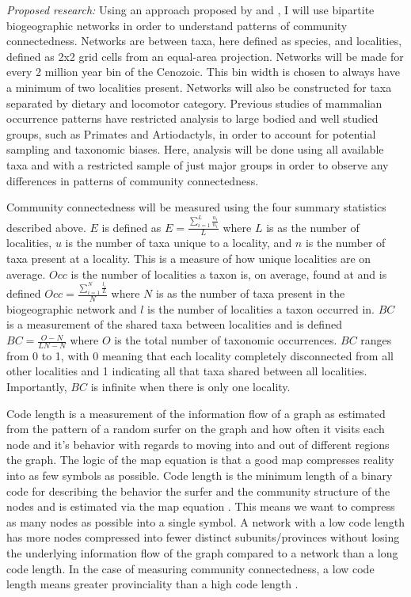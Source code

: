 \documentclass[12pt,letterpaper]{article}
\begin{document}
\textit{Proposed research:}
Using an approach proposed by \citet{Sidor2013} and \citet{Vilhena2013}, I will use bipartite biogeographic networks in order to understand patterns of community connectedness. Networks are between taxa, here defined as species, and localities, defined as 2x2 grid cells from an equal-area projection. Networks will be made for every 2 million year bin of the Cenozoic. This bin width is chosen to always have a minimum of two localities present. Networks will also be constructed for taxa separated by dietary and locomotor category. Previous studies of mammalian occurrence patterns have restricted analysis to large bodied and well studied groups, such as Primates and Artiodactyls, in order to account for potential sampling and taxonomic biases. Here, analysis will be done using all available taxa and with a restricted sample of just major groups in order to observe any differences in patterns of community connectedness. 

Community connectedness will be measured using the four summary statistics described above. \(E\) is defined as 
\(
  E = \frac{\sum_{i = 1}^{L} \frac{u_{i}}{n_{i}}}{L}
\)
where \(L\) is as the number of localities, \(u\) is the number of taxa unique to a locality, and \(n\) is the number of taxa present at a locality. This is a measure of how unique localities are on average. \(Occ\) is the number of localities a taxon is, on average, found at and is defined
\(
  Occ = \frac{\sum_{i = 1}^{N} \frac{l_{i}}{L}}{N}
\)
where \(N\) is as the number of taxa present in the biogeographic network and \(l\) is the number of localities a taxon occurred in. \(BC\) is a measurement of the shared taxa between localities and is defined 
\(
  BC = \frac{O - N}{LN - N}
\)
where \(O\) is the total number of taxonomic occurrences. \(BC\) ranges from 0 to 1, with 0 meaning that each locality completely disconnected from all other localities and 1 indicating all that taxa shared between all localities. Importantly, \(BC\) is infinite when there is only one locality.

Code length is a measurement of the information flow of a graph as estimated from the pattern of a random surfer \citep{Brin1998} on the graph and how often it visits each node and it's behavior with regards to moving into and out of different regions the graph. The logic of the map equation is that a good map compresses reality into as few symbols as possible. Code length is the minimum length of a binary code for describing the behavior the surfer and the community structure of the nodes and is estimated via the map equation \citep{Rosvall2008,Rosvall2010b}. This means we want to compress as many nodes as possible into a single symbol. A network with a low code length has more nodes compressed into fewer distinct subunits/provinces without losing the underlying information flow of the graph compared to a network than a long code length. In the case of measuring community connectedness, a low code length means greater provinciality than a high code length \citep{Sidor2013}. 
\end{document}
